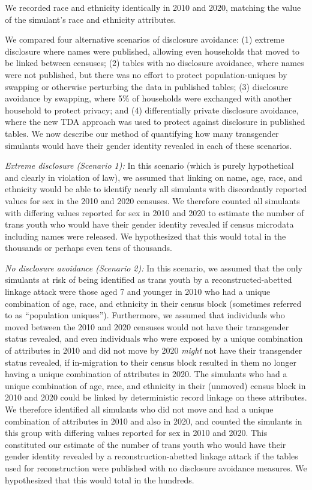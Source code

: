 \documentclass{jpc} %
\theoremstyle{plain}\newtheorem{satz}[thm]{Satz} %
\begin{document}
We recorded race and ethnicity identically in 2010 and 2020, matching the value of the simulant's race and ethnicity attributes.

We compared four alternative scenarios of disclosure avoidance: (1) extreme disclosure where names were published, allowing even households that moved to be linked between censuses; (2) tables with no disclosure avoidance, where names were not published, but there was no effort to protect population-uniques by swapping or otherwise perturbing the data in published tables; (3) disclosure avoidance by swapping, where 5\% of households were exchanged with another household to protect privacy; and (4) differentially private disclosure avoidance, where the new TDA approach was used to protect against disclosure in published tables.  We now describe our method of quantifying how many transgender simulants would have their gender identity revealed in each of these scenarios.

\emph{Extreme disclosure (Scenario 1):} In this scenario (which is purely hypothetical and clearly in violation of law), we assumed that linking on name, age, race, and ethnicity would be able to identify nearly all simulants with discordantly reported values for sex in the 2010 and 2020 censuses.  We therefore counted all simulants with differing values reported for sex in 2010 and 2020 to estimate the number of trans youth who would have their gender identity revealed if census microdata including names were released.  We hypothesized that this would total in the thousands or perhaps even tens of thousands.

\emph{No disclosure avoidance (Scenario 2):} In this scenario, we assumed that the only simulants at risk of being identified as trans youth by a reconstructed-abetted linkage attack were those aged 7 and younger in 2010 who had a unique combination of age, race, and ethnicity in their census block (sometimes referred to as ``population uniques'').  Furthermore, we assumed that individuals who moved between the 2010 and 2020 censuses would not have their transgender status revealed, and even individuals who were exposed by a unique combination of attributes in 2010 and did not move by 2020 \emph{might} not have their transgender status revealed, if in-migration to their census block resulted in them no longer having a unique combination of attributes in 2020.  The simulants who had a unique combination of age, race, and ethnicity in their (unmoved) census block in 2010 and 2020 could be linked by deterministic record linkage on these attributes. We therefore identified all simulants who did not move and had a unique combination of attributes in 2010 and also in 2020, and counted the simulants in this group with differing values reported for sex in 2010 and 2020.  This constituted our estimate of the number of trans youth who would have their gender identity revealed by a reconstruction-abetted linkage attack if the tables used for reconstruction were published with no disclosure avoidance measures.
We hypothesized that this would total in the hundreds.
\end{document}
